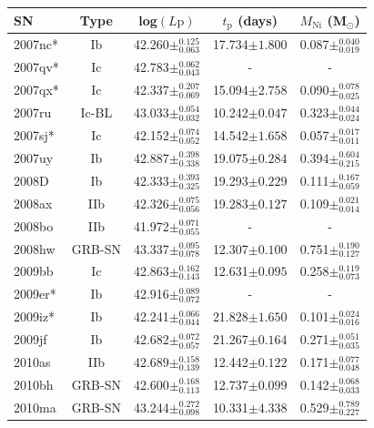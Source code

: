 \documentclass[a4paper,fleqn,usenatbib]{mnras}
\begin{document}
\begin{table}
\renewcommand{\arraystretch}{1.5}
 \centering
 \begin{minipage}{110mm}
 \begin{tabular}{lcccc}
  \hline
 SN & Type & log$(L{\mathrm{p}})$  & $t_{\mathrm{p}}$ (days) & $M_{\mathrm{Ni}}$ (M$_{\odot}$)   \\
  \hline
2007nc* & Ib & 42.260$\pm^{0.125}_{0.063}$ &17.734$\pm{1.800}$ &0.087$\pm^{0.040}_{0.019}$ \\  
2007qv* & Ic & 42.783$\pm^{0.062}_{0.043}$ &- &- \\  
2007qx* & Ic & 42.337$\pm^{0.207}_{0.069}$ &15.094$\pm{2.758}$ &0.090$\pm^{0.078}_{0.025}$ \\
2007ru & Ic-BL & 43.033$\pm^{0.054}_{0.032}$ &10.242$\pm{0.047}$ &0.323$\pm^{0.044}_{0.024}$ \\
2007sj* & Ic & 42.152$\pm^{0.074}_{0.052}$ &14.542$\pm{1.658}$ &0.057$\pm^{0.017}_{0.011}$ \\
2007uy & Ib & 42.887$\pm^{0.398}_{0.338}$ &19.075$\pm{0.284}$ &0.394$\pm^{0.604}_{0.215}$ \\
2008D & Ib & 42.333$\pm^{0.393}_{0.325}$ &19.293$\pm{0.229}$ &0.111$\pm^{0.167}_{0.059}$ \\
2008ax & IIb & 42.326$\pm^{0.075}_{0.056}$ &19.283$\pm{0.127}$ &0.109$\pm^{0.021}_{0.014}$ \\
2008bo & IIb & 41.972$\pm^{0.071}_{0.055}$ &- &- \\
2008hw & GRB-SN & 43.337$\pm^{0.095}_{0.078}$ &12.307$\pm{0.100}$ &0.751$\pm^{0.190}_{0.127}$ \\
2009bb & Ic & 42.863$\pm^{0.162}_{0.143}$ &12.631$\pm{0.095}$ &0.258$\pm^{0.119}_{0.073}$ \\
2009er* & Ib & 42.916$\pm^{0.089}_{0.072}$ &- &- \\
2009iz* & Ib & 42.241$\pm^{0.066}_{0.044}$ &21.828$\pm{1.650}$ &0.101$\pm^{0.024}_{0.016}$ \\
2009jf & Ib & 42.682$\pm^{0.072}_{0.057}$ &21.267$\pm{0.164}$ &0.271$\pm^{0.051}_{0.035}$ \\
2010as & IIb & 42.689$\pm^{0.158}_{0.139}$ &12.442$\pm{0.122}$ &0.171$\pm^{0.077}_{0.048}$ \\
2010bh & GRB-SN & 42.600$\pm^{0.168}_{0.113}$ &12.737$\pm{0.099}$ &0.142$\pm^{0.068}_{0.033}$ \\
2010ma & GRB-SN & 43.244$\pm^{0.272}_{0.098}$ &10.331$\pm{4.338}$ &0.529$\pm^{0.789}_{0.227}$ \\

\end{tabular}
\end{minipage}
\end{table}
\end{document}
